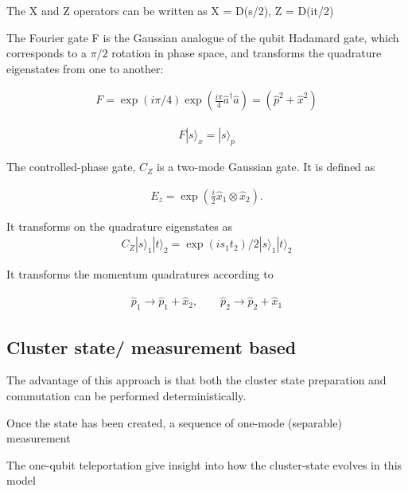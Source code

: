 \documentclass[pra,
superscriptaddress,
 amsmath,amssymb,
 aps,twocolumn]{revtex4-1}
\newcommand{\ket}[1]{|{#1}\rangle}
\begin{document}
The X and Z operators can be written as 
X = D(s/2), Z = D(it/2)



The Fourier gate F is the Gaussian analogue of the qubit Hadamard gate, which corresponds to a $\pi/2$ rotation in phase space, and transforms the quadrature eigenstates from one to another:

\begin{eqnarray}
F = \exp(i\pi/4)\exp(\frac{i\pi}{4} \hat a^\dagger \hat a) = (\hat p^2+\hat x^2)
\end{eqnarray}

\begin{eqnarray}
F\ket{s}_x = \ket{s}_p
\end{eqnarray}


The controlled-phase gate, $C_Z$ is a two-mode Gaussian gate. It is defined as

\begin{eqnarray}
E_z = \exp\left(\frac{i}{2} \hat x_1 \otimes \hat x_2 \right).
\end{eqnarray}

It transforms on the quadrature eigenstates as
\begin{eqnarray}
C_Z \ket{s}_1 \ket{t}_2 = \exp(i s_1 t_2)/2 \ket{s}_1\ket{t}_2  
\end{eqnarray}


It transforms the momentum quadratures according to

\begin{eqnarray}
\hat p_1 \rightarrow \hat p_1 + \hat x_2, \qquad \hat p_2 \rightarrow \hat p_2 + \hat x_1
\end{eqnarray}

\subsection{Cluster state/ measurement based}



\cite{bib:PhysRevLett.97.110501}
The advantage of this approach is that both the cluster state preparation and commutation can be performed deterministically.

Once the state has been created, a sequence of one-mode (separable) measurement 


The one-qubit teleportation give insight into how the cluster-state evolves in this model
\end{document}
